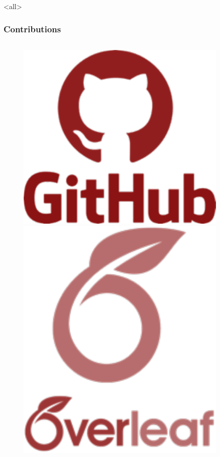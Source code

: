 \documentclass[ignorenonframetext,allowframebreaks,aspectratio=169,t,8pt, xcolor=table]{beamer}
\begin{document}
\mode<all>{}
\begin{frame}
\frametitle{Contributions}
\begin{columns}
\begin{column}{0.1\textwidth}

    \begin{figure}
           \centering
           \includegraphics[width=0.9\textwidth]{Latex/Sources/EDU/Contribs/contribute/ContribPictures/github.pdf}\\
                \includegraphics[width=0.9\textwidth]{Latex/Sources/EDU/Contribs/contribute/ContribPictures/overleaf.pdf}

\end{figure}
\end{column}
\end{columns}
\end{frame}
\end{document}
